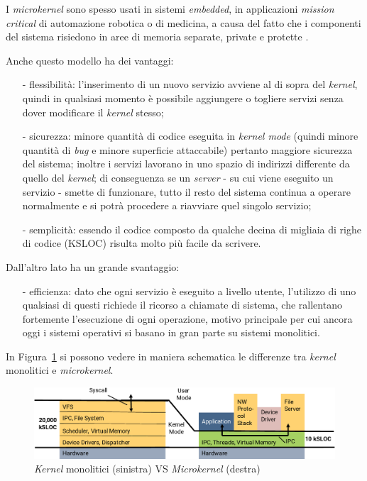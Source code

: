 I \textit{microkernel} sono spesso usati in sistemi \textit{embedded}, in applicazioni \textit{mission critical} di automazione robotica o di medicina, a causa del fatto che i componenti del sistema risiedono in aree di memoria separate, private e protette \cite{kernelWikipedia}.

Anche questo modello ha dei vantaggi:
\begin{itemize}
	\item[-] flessibilità: l'inserimento di un nuovo servizio avviene al di sopra del \textit{kernel}, quindi in qualsiasi momento è possibile aggiungere o togliere servizi senza dover modificare il \textit{kernel} stesso;
	\item[-] sicurezza: minore quantità di codice eseguita in \textit{kernel mode} (quindi minore quantità di \textit{bug} e minore superficie attaccabile) pertanto maggiore sicurezza del sistema; inoltre i servizi lavorano in uno spazio di indirizzi differente da quello del \textit{kernel}; di conseguenza se un \textit{server} - su cui viene eseguito un servizio - smette di funzionare, tutto il resto del sistema continua a operare normalmente e si potrà procedere a riavviare quel singolo servizio;
	\item[-] semplicità: essendo il codice composto da qualche decina di migliaia di righe di codice (KSLOC) risulta molto più facile da scrivere.
\end{itemize}
Dall'altro lato ha un grande svantaggio:
\begin{itemize}
	\item[-] efficienza: dato che ogni servizio è eseguito a livello utente, l'utilizzo di uno qualsiasi di questi richiede il ricorso a chiamate di sistema, che rallentano fortemente l'esecuzione di ogni operazione, motivo principale per cui ancora oggi i sistemi operativi si basano in gran parte su sistemi monolitici.
\end{itemize}
In Figura~\ref{fig:MonolithicVSmicrokernel} si possono vedere in maniera schematica le differenze tra \textit{kernel} monolitici e \textit{microkernel}.

\begin{figure}[h]
  \includegraphics[width=\linewidth]{img/MonolithicVSmicrokernel.png}
  \caption{\textit{Kernel} monolitici (sinistra) VS \textit{Microkernel} (destra)}
  \label{fig:MonolithicVSmicrokernel}
\end{figure}
\newpage

